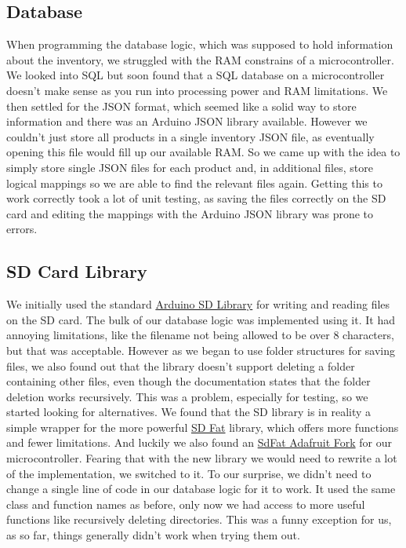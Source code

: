 \documentclass{article}
\begin{document}
\subsection{Database}
When programming the database logic, which was supposed to hold information about the inventory, we struggled with the RAM constrains of a microcontroller.
We looked into SQL but soon found that a SQL database on a microcontroller doesn't make sense as you run into processing power and RAM limitations.
We then settled for the JSON format, which seemed like a solid way to store information and there was an Arduino JSON library available.
However we couldn't just store all products in a single inventory JSON file, as eventually opening this file would fill up our available RAM.
So we came up with the idea to simply store single JSON files for each product and, in additional files, store logical mappings so we are able to find the relevant files again.
Getting this to work correctly took a lot of unit testing, as saving the files correctly on the SD card and editing the mappings with the Arduino JSON library was prone to errors.

\subsection{SD Card Library}
We initially used the standard \href{https://github.com/arduino-libraries/SD}{Arduino SD Library} for writing and reading files on the SD card. The bulk of our database logic was implemented using it.
It had annoying limitations, like the filename not being allowed to be over 8 characters, but that was acceptable.
However as we began to use folder structures for saving files, we also found out that the library doesn't support deleting a folder containing other files, even though the documentation states that the folder deletion works recursively.
This was a problem, especially for testing, so we started looking for alternatives. We found that the SD library is in reality a simple wrapper for the more powerful \href{https://github.com/greiman/SdFat}{SD Fat} library, which offers more functions and fewer limitations.
And luckily we also found an \href{https://github.com/adafruit/SdFat}{SdFat Adafruit Fork} for our microcontroller. Fearing that with the new library we would need to rewrite a lot of the implementation, we switched to it.
To our surprise, we didn't need to change a single line of code in our database logic for it to work. It used the same class and function names as before, only now we had access to more useful functions like recursively deleting directories.
This was a funny exception for us, as so far, things generally didn't work when trying them out.
\end{document}
